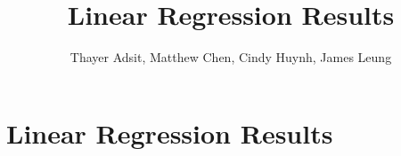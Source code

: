 \documentclass[12pt]{article}
\begin{document}
\title{Linear Regression Results}

\author{Thayer Adsit, Matthew Chen, Cindy Huynh, James Leung}

\maketitle

\section{Linear Regression Results}






\end{document}
